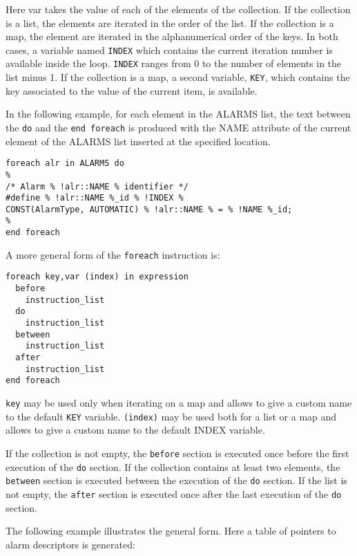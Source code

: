 \documentclass[11pt]{article}
\newcommand{\var}[1]{{\small\ttfamily #1}}
\begin{document}
Here var takes the value of each of the elements of the collection. If the collection is a list, the elements are iterated in the order of the list. If the collection is a map, the element are iterated in the alphanumerical order of the keys. In both cases, a variable named \lstinline{INDEX} which contains the current iteration number is available inside the loop. \lstinline{INDEX} ranges from 0 to the number of elements in the list minus 1. If the collection is a map, a second variable, \lstinline{KEY}, which contains the key associated to the value of the current item, is available.

In the following example, for each element in the \var{ALARMS} list, the text between the \lstinline{do} and the \lstinline{end foreach} is produced with the \var{NAME} attribute of the current element of the \var{ALARMS} list inserted at the specified location.

\begin{lstlisting}
foreach alr in ALARMS do
%
/* Alarm % !alr::NAME % identifier */
#define % !alr::NAME %_id % !INDEX %
CONST(AlarmType, AUTOMATIC) % !alr::NAME % = % !NAME %_id;
%
end foreach
\end{lstlisting}

A more general form of the \lstinline{foreach} instruction is:

\begin{lstlisting}
foreach key,var (index) in expression
  before
    instruction_list
  do 
    instruction_list
  between
    instruction_list
  after 
    instruction_list
end foreach
\end{lstlisting}

\texttt{key} may be used only when iterating on a map and allows to give a custom name to the default \lstinline{KEY} variable. \lstinline{(index)} may be used both for a list or a map and allows to give a custom name to the default \var{INDEX} variable.

If the collection is not empty, the \lstinline{before} section is executed once before the first execution of the \lstinline{do} section. If the collection contains at least two elements, the \lstinline{between} section is executed between the execution of the \lstinline{do} section.  If the list is not empty, the \lstinline{after} section is executed once after the last execution of the \lstinline{do} section.

The following example illustrates the general form. Here a table of pointers to alarm descriptors is generated:
\end{document}
